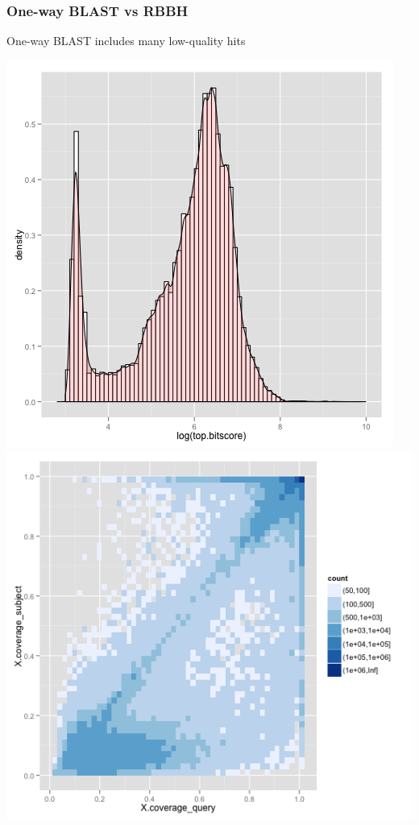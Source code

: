 \begin{frame}
  \frametitle{One-way BLAST vs RBBH}   
  \begin{alertblock}{One-way BLAST includes many low-quality hits}
    \begin{center}
      \includegraphics[height=0.33\textheight]{images/rbbh1}
      \includegraphics[height=0.33\textheight]{images/rbbh2}

\end{center}
\end{alertblock}
\end{frame}
